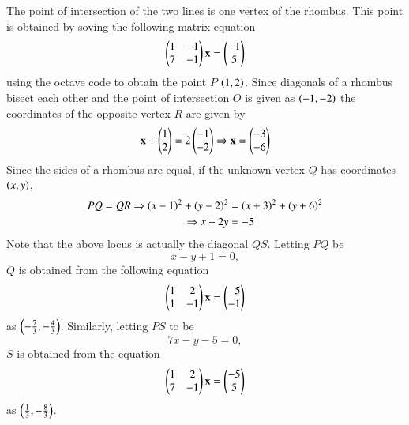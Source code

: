 The point of intersection of the two lines is one vertex of the rhombus.  This point is obtained by soving the following matrix equation 
%
\begin{equation}
\begin{pmatrix}
1 & -1
\\
7 & -1
\end{pmatrix}
\mathbf{x} = 
\begin{pmatrix}
-1
\\
5
\end{pmatrix}
\end{equation}
%
using the octave code to obtain the point $P$ $\left(1,2\right)$.  Since diagonals of a rhombus bisect each other and the point of intersection $O$ is given as $\left(-1,-2\right)$ the coordinates of the opposite vertex $R$ are given by 
%
\begin{equation}
\mathbf{x} + 
\begin{pmatrix}
1 
\\
2
\end{pmatrix}
= 
2
\begin{pmatrix}
-1 
\\
-2
\end{pmatrix} \Rightarrow \mathbf{x} = 
\begin{pmatrix}
-3
\\
-6
\end{pmatrix}
\end{equation}
%
Since the sides of a rhombus are equal, if the unknown vertex $Q$ has coordinates $\left(x,y\right)$,
\begin{align}
PQ = QR \Rightarrow \left(x-1\right)^2 + \left(y-2\right)^2 &= \left(x+3\right)^2  + \left(y+6\right)^2 \nonumber \\
\Rightarrow x + 2 y &= -5 
\end{align}
Note that the above locus is actually the diagonal $QS$.  Letting $PQ$ be
\begin{equation}
x-y+1 = 0,
\end{equation}
%
$Q$ is obtained from the following equation
%
%
\begin{equation}
\begin{pmatrix}
1 & 2
\\
1 & -1
\end{pmatrix}
\mathbf{x} = 
\begin{pmatrix}
-5
\\
-1
\end{pmatrix}
\end{equation}
%
as $\left(-\frac{7}{3},-\frac{4}{3}\right)$.
%
Similarly, letting $PS$ to be
%
\begin{equation}
7x-y-5=0,
\end{equation}
%
$S$ is obtained from the equation
%
\begin{equation}
\begin{pmatrix}
1 & 2
\\
7 & -1
\end{pmatrix}
\mathbf{x} = 
\begin{pmatrix}
-5
\\
5
\end{pmatrix}
\end{equation}
%
as $\left(\frac{1}{3},-\frac{8}{3}\right)$.


